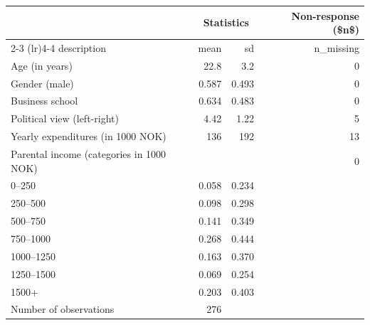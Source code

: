 \begin{table}[t]
\fontsize{12.0pt}{14.4pt}\selectfont
\begin{tabular*}{\linewidth}{@{\extracolsep{\fill}}lrrr}
\toprule
 & \multicolumn{2}{c}{Statistics} & Non-response (\$n\$) \\ 
\cmidrule(lr){2-3} \cmidrule(lr){4-4}
description & mean & sd & n\_missing \\ 
\midrule\addlinespace[2.5pt]
Age (in years) & 22.8 & 3.2 & 0 \\ 
Gender (male) & 0.587 & 0.493 & 0 \\ 
Business school & 0.634 & 0.483 & 0 \\ 
Political view (left-right) & 4.42 & 1.22 & 5 \\ 
Yearly expenditures (in 1000 NOK) & 136 & 192 & 13 \\ 
Parental income (categories in 1000 NOK) &  &  & 0 \\ 
  0--250 & 0.058 & 0.234 &  \\ 
  250--500 & 0.098 & 0.298 &  \\ 
  500--750 & 0.141 & 0.349 &  \\ 
  750--1000 & 0.268 & 0.444 &  \\ 
  1000--1250 & 0.163 & 0.370 &  \\ 
  1250--1500 & 0.069 & 0.254 &  \\ 
  1500+ & 0.203 & 0.403 &  \\ 
 Number of observations & 276 &  &  \\ 
\bottomrule
\end{tabular*}
\end{table}

